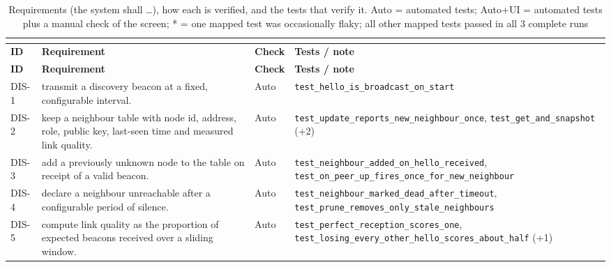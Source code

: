 \begingroup\footnotesize
\setlength{\tabcolsep}{3pt}
\begin{longtable}{@{}p{0.95cm}p{6.6cm}p{1.15cm}p{8.6cm}@{}}
\caption{Requirements (the system shall \ldots), how each is verified, and the tests that verify it. Auto = automated tests; Auto+UI = automated tests plus a manual check of the screen; * = one mapped test was occasionally flaky; all other mapped tests passed in all 3 complete runs}\\
\label{tab:trace}\\
\toprule \textbf{ID} & \textbf{Requirement} & \textbf{Check} & \textbf{Tests / note} \\ \midrule \endfirsthead
\toprule \textbf{ID} & \textbf{Requirement} & \textbf{Check} & \textbf{Tests / note} \\ \midrule \endhead
DIS-1 & transmit a discovery beacon at a fixed, configurable interval. & Auto & \texttt{test\_\allowbreak{}hello\_\allowbreak{}is\_\allowbreak{}broadcast\_\allowbreak{}on\_\allowbreak{}start} \\
DIS-2 & keep a neighbour table with node id, address, role, public key, last-seen time and measured link quality. & Auto & \texttt{test\_\allowbreak{}update\_\allowbreak{}reports\_\allowbreak{}new\_\allowbreak{}neighbour\_\allowbreak{}once}, \texttt{test\_\allowbreak{}get\_\allowbreak{}and\_\allowbreak{}snapshot} (+2) \\
DIS-3 & add a previously unknown node to the table on receipt of a valid beacon. & Auto & \texttt{test\_\allowbreak{}neighbour\_\allowbreak{}added\_\allowbreak{}on\_\allowbreak{}hello\_\allowbreak{}received}, \texttt{test\_\allowbreak{}on\_\allowbreak{}peer\_\allowbreak{}up\_\allowbreak{}fires\_\allowbreak{}once\_\allowbreak{}for\_\allowbreak{}new\_\allowbreak{}neighbour} \\
DIS-4 & declare a neighbour unreachable after a configurable period of silence. & Auto & \texttt{test\_\allowbreak{}neighbour\_\allowbreak{}marked\_\allowbreak{}dead\_\allowbreak{}after\_\allowbreak{}timeout}, \texttt{test\_\allowbreak{}prune\_\allowbreak{}removes\_\allowbreak{}only\_\allowbreak{}stale\_\allowbreak{}neighbours} \\
DIS-5 & compute link quality as the proportion of expected beacons received over a sliding window. & Auto & \texttt{test\_\allowbreak{}perfect\_\allowbreak{}reception\_\allowbreak{}scores\_\allowbreak{}one}, \texttt{test\_\allowbreak{}losing\_\allowbreak{}every\_\allowbreak{}other\_\allowbreak{}hello\_\allowbreak{}scores\_\allowbreak{}about\_\allowbreak{}half} (+1) \\

\end{longtable}
